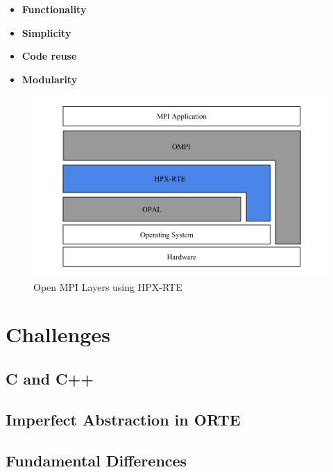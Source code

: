 \begin{itemize}
\item \textbf{Functionality}\\
  
\item \textbf{Simplicity}\\
  
\item \textbf{Code reuse}\\

\item \textbf{Modularity}\\

\end{itemize}

\begin{figure}[h!]
\centering
\includegraphics[scale=0.4]{images/open-mpi-layers-hpx-rte.png}
\caption[Open MPI Layers using HPX-RTE]{Open MPI Layers using HPX-RTE}
\label{fig:open-mpi-layers-hpx-rte}
\end{figure}

\section{Challenges}
\label{sec:challenges}

\subsection{C and C++}
\subsection{Imperfect Abstraction in ORTE}
\subsection{Fundamental Differences}


